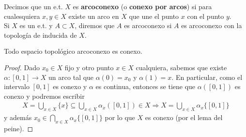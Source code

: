 \begin{definicion}
    Decimos que un e.t. $X$ es \textbf{arcoconexo} (o \textbf{conexo por arcos}) si para cualesquiera $x,y\in X$ existe un arco en $X$ que une el punto $x$ con el punto $y$.\\

    Si $X$ es un e.t. y $A\subset X$, diremos que $A$ es arcoconexo si $A$ es arcoconexo con la topología de inducida de $X$.
\end{definicion}

\begin{teo}
    Todo espacio topológico arcoconexo es conexo.
    \begin{proof}
        Dado $x_0\in X$ fijo y otro punto $x\in X$ cualquiera, sabemos que existe $\alpha:[0,1]\to X$ un arco tal que $\alpha(0)=x_0$ y $\alpha(1)=x$. En particular, como el intervalo $[0,1]$ es conexo y $\alpha$ es continua, entonces se tiene que $\alpha([0,1])$ es conexo y podremos escribir 
        \begin{gather*}
            X=\bigcup\limits_{x\in X}\{x\}\subseteq \bigcup\limits_{x\in X} \alpha_x ([0,1])\in X \Rightarrow X = \bigcup\limits_{x\in X}\alpha_x\{[0,1]\}
        \end{gather*}
        y además $x_0 \in \bigcap\limits_{x\in X}\alpha_x\{[0,1]\}$ por lo que $X$ es conexo (por el lema del peine).
    \end{proof}
\end{teo}


